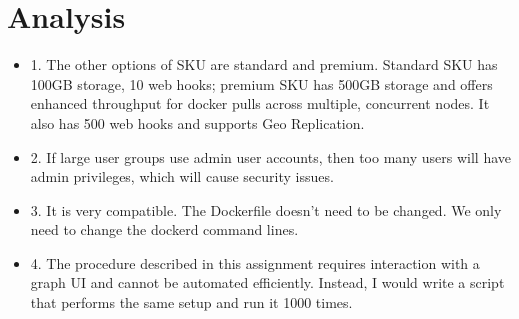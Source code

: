 \documentclass{article}
\begin{document}
\section{Analysis}
\begin{itemize}
    \item 1. The other options of SKU are standard and premium. Standard SKU has 100GB storage, 10 web hooks; premium SKU has 500GB storage and offers enhanced throughput for docker pulls across multiple, concurrent nodes. It also has 500 web hooks and supports Geo Replication.
    \item 2. If large user groups use admin user accounts, then too many users will have admin privileges, which will cause security issues.
    \item 3. It is very compatible. The Dockerfile doesn't need to be changed. We only need to change the dockerd command lines.
    \item 4. The procedure described in this assignment requires interaction with a graph UI and cannot be automated efficiently. Instead, I would write a script that performs the same setup and run it 1000 times.
\end{itemize}
\end{document}
